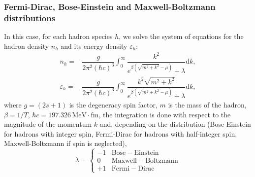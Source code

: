 \documentclass[12pt, a4paper]{article}
\newcommand{\dd}{\mathrm{d}}
\newcommand{\MeV}{\mathrm{MeV}}
\newcommand{\fm}{\mathrm{fm}}
\begin{document}
\subsubsection{Fermi-Dirac, Bose-Einstein and Maxwell-Boltzmann distributions}
In this case, for each hadron species $h$, we solve the system of equations for the hadron density $n_h$ and its energy density $\varepsilon_h$:
\begin{align}
	n_h=&\dfrac{g}{2\pi^2 (\hbar c)^3}\int_0^\infty \dfrac{k^2}{e^{\beta{(\sqrt{m^2+k^2}-\mu)}}+\lambda}\dd k,\\
	\varepsilon_h=&\dfrac{g}{2\pi^2 (\hbar c)^3}\int_0^\infty \dfrac{k^2\sqrt{m^2+k^2}}{e^{\beta{(\sqrt{m^2+k^2}-\mu)}}+\lambda}\dd k,
	\label{eq:distributions}
\end{align}
where $g=(2 s+1)$ is the degeneracy spin factor, $m$ is the mass of the hadron, $\beta=1/T$, $\hbar c=197.326\,\MeV\cdot\fm$, the integration is done with respect to the magnitude of the momentum $k$ and, depending on the distribution (Bose-Einstein for hadrons with integer spin, Fermi-Dirac for hadrons with half-integer spin, Maxwell-Boltzmann if spin is neglected),
\begin{equation}
\lambda=\left\{
\begin{array}{rl}
-1 &  \mathrm{Bose-Einstein} \\
0 & \mathrm{Maxwell-Boltzmann}\\
+1 & \mathrm{Fermi-Dirac}
\end{array} \right.
\label{eq:BE_FD_factor}
\end{equation}
\end{document}
